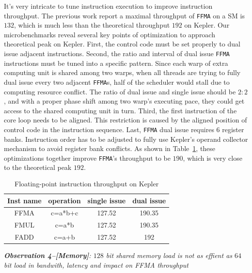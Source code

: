 \documentclass{sig-alternate-05-2015}
\begin{document}
It's very intricate to tune instruction execution to improve instruction throughput. The previous work report a maximal throughput of {\tt FFMA} on a SM is $132$, which is much less than the theoretical throughput $192$ on Kepler. Our microbenchmarks reveal several key points of optimization to approach theoretical peak on Kepler. First, the control code must be set properly to dual issue adjacent instructions. Second, the ratio and interval of dual issue {\tt FFMA} instructions must be tuned into a specific pattern. Since each warp of extra computing unit is shared among two warps, when all threads are trying to fully dual issue every two adjacent {\tt FFMA}s, half of the scheduler would stall due to computing resource conflict. The ratio of dual issue and single issue should be $2:2$, and with a proper phase shift among two warp's executing pace, they could get access to the shared computing unit in turn. Third, the first instruction of the core loop needs to be aligned. This restriction is caused by the aligned position of control code in the instruction sequence. Last, {\tt FFMA} dual issue requires 6 register banks. Instruction order has to be adjusted to fully use Kepler's operand collector mechanism to avoid register bank conflicts. As shown in Table~\ref{tab:ffma}, these optimizations together improve {\tt FFMA}'s throughput  to be $190$, which is very close to the theoretical peak $192$.

\begin{table}[htbp]
\caption{Floating-point instruction throughput on Kepler}
\centering
\scalebox{1.} {
\begin{tabular}{|c||c|c|c|}
\hline
Inst name&operation&single issue&dual issue\\
\hline
FFMA&c=a*b+c&127.52&190.35 \\
\hline
FMUL&c=a*b&127.52&190.35 \\
\hline
FADD&c=a+b&127.52&192\\
\hline
\end{tabular}
}
\label{tab:ffma}
\end{table}


{\em {\bf Observation 4--[Memory]}: $128$ bit shared memory load is not as effient as $64$ bit load in bandwith, latency
and impact on FFMA throughput}
\end{document}
